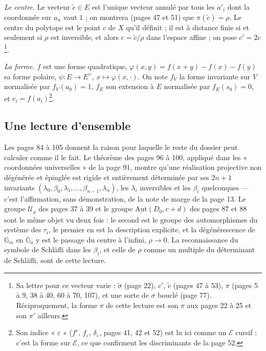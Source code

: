 \documentclass[11pt,a4paper]{article}
\begin{document}
\emph{Le centre.} Le vecteur $\tilde c \in E$ est l'unique vecteur annulé par
tous les $a'_i$ dont la coordonnée sur $a_n$ vaut $1$ ; on montrera (pages 47
et 51) que $\pi(\tilde c) = \rho$. Le centre du polytope est le point $c$ de
$X$ qu'il définit ; il est à distance finie si et seulement si $\rho$ est
inversible, et alors $c = \tilde c/\rho$ dans l'espace affine ; on pose $c' =
2c$\footnote{Sa lettre pour ce vecteur varie : $\tilde\sigma$ (page 22),
$c'$, $\tilde c$ (pages 47 à 53), $\pi$ (pages 5 à 9, 38 à 40, 60 à 70, 107),
et une sorte de $\sigma$ bouclé (page 77). Réciproquement, la forme $\pi$ de
cette lecture est son $\pi$ aux pages 22 à 25 et son $\pi'$ ailleurs.}.

\emph{La forme.} $f$ est une forme quadratique, $\varphi(x, y) = f(x+y) -
f(x) - f(y)$ sa forme polaire, $\psi \colon E \to E^\vee$, $x \mapsto
\varphi(x, \cdot)$. On note $f_V$ la forme invariante sur $V$ normalisée par
$f_V(a_0) = 1$, $f_E$ son extension à $E$ normalisée par $f_E(s_0) = 0$, et
$c_i = f(a_i)$\footnote{Son indice « $\varepsilon$ » ($f^\varepsilon$,
$f_\varepsilon$, $\delta_\varepsilon$, pages 41, 42 et 52) est lu ici comme un
$\mathcal{E}$ cursif : c'est la forme sur $\mathcal{E}$, ce que confirment les
discriminants de la page 52.}.

\subsection*{Une lecture d'ensemble}

Les pages 84 à 105 donnent la raison pour laquelle le reste du dossier peut
calculer comme il le fait. Le théorème des pages 96 à 100, appliqué dans les
« coordonnées universelles » de la page 91, montre qu'une réalisation
projective non dégénérée et épinglée est rigide et entièrement déterminée par
ses $2n+1$ invariants $(\lambda_0, \beta_0, \lambda_1, \ldots, \beta_{n-1},
\lambda_n)$, les $\lambda_i$ inversibles et les $\beta_i$ quelconques ---
c'est l'affirmation, sans démonstration, de la note de marge de la page 13.
Le groupe $\mathcal{U}_\rho$ des pages 37 à 39 et le groupe
$\underline{\mathrm{Aut}}(D_0, c + d)$ des pages 87 et 88 sont le même objet
vu deux fois : le second est le groupe des automorphismes du système des
$\tau_i$, le premier en est la description explicite, et la dégénérescence
de $\mathbb{G}_m$ en $\mathbb{G}_a$ y est le passage du centre à l'infini,
$\rho \to 0$. La reconnaissance du symbole de Schläfli dans les $\beta_i$, et
celle de $\rho$ comme un multiple du déterminant de Schläfli, sont de cette
lecture.
\end{document}
